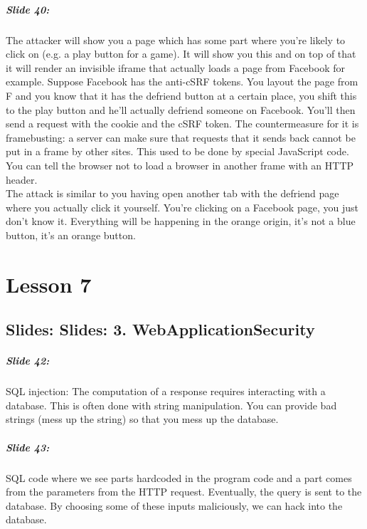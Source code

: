 \documentclass[10pt,a4paper]{report}
\begin{document}
\paragraph{Slide 40:} The attacker will show you a page which has some part where you're likely to click on (e.g. a play button for a game). It will show you this and on top of that it will render an invisible iframe that actually loads a page from Facebook for example. Suppose Facebook has the anti-cSRF tokens. You layout the page from F and you know that it has the defriend button at a certain place, you shift this to the play button and he'll actually defriend someone on Facebook. You'll then send a request with the cookie and the cSRF token. The countermeasure for it is framebusting: a server can make sure that requests that it sends back cannot be put in a frame by other sites. This used to be done by special JavaScript code. You can tell the browser not to load a browser in another frame with an HTTP header.\\ 
The attack is similar to you having open another tab with the defriend page where you actually click it yourself. You're clicking on a Facebook page, you just don't know it. Everything will be happening in the orange origin, it's not a blue button, it's an orange button. 

\chapter{Lesson 7}
\section{Slides: Slides: 3. WebApplicationSecurity}

\paragraph{Slide 42:} SQL injection: The computation of a response requires interacting with a database. This is often done with string manipulation. You can provide bad strings (mess up the string) so that you mess up the database. 

\paragraph{Slide 43:} SQL code where we see parts hardcoded in the program code and a part comes from the parameters from the HTTP request. Eventually, the query is sent to the database. By choosing some of these inputs maliciously, we can hack into the database.
\end{document}

